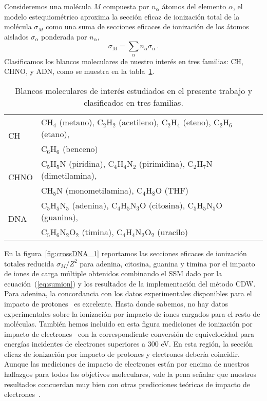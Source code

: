 Consideremos una molécula $M$ compuesta por $n_{\alpha}$ átomos del 
elemento $\alpha$, el modelo estequiométrico aproxima la sección eficaz 
de ionización total de la molécula $\sigma_{M}$ como una suma de 
secciones eficaces de ionización de los átomos aislados $\sigma_{\alpha}$ 
ponderada por $n_{\alpha}$, 
\begin{equation}
 \sigma_{M}=\sum\limits_{\alpha}n_{\alpha}\sigma_{\alpha}\,.  
 \label{eq:sumion}
\end{equation}
Clasificamos los blancos moleculares de nuestro interés en tres
familias: CH, CHNO, y ADN, como se muestra en la tabla~\ref{tab:families}.

\begin{table}[t]
\begin{center}
\begin{tabular}{|p{}|p{}|}
\hline
\multirow{2}{*}{CH} & CH$_4$ (metano), C$_2$H$_2$ (acetileno), 
C$_2$H$_4$ (eteno), C$_2$H$_6$ (etano), \\ & C$_6$H$_6$ (benceno) \\
\hline
\multirow{2}{*}{CHNO} & C$_5$H$_5$N (piridina), C$_4$H$_4$N$_2$ (pirimidina), 
C$_2$H$_7$N (dimetilamina), \\ & CH$_5$N (monometilamina), 
C$_4$H$_8$O (THF) \\[0.2em]
\hline
\multirow{2}{*}{DNA} & C$_5$H$_5$N$_5$ (adenina), C$_4$H$_5$N$_3$O (citosina), 
C$_5$H$_5$N$_5$O (guanina), \\ & C$_5$H$_6$N$_2$O$_2$ (timina),
C$_4$H$_4$N$_2$O$_2$ (uracilo) \\
\hline
\end{tabular}
\caption[Blancos moleculares estudiados y clasificados en tres familias.]
{Blancos moleculares de interés estudiados en el presente trabajo y 
clasificados en tres familias.}
\label{tab:families}
\end{center}
\end{table}

En la figura~\ref{fig:crossDNA_1} reportamos las secciones eficaces de 
ionización totales reducida $\sigma_M/Z^2$ para adenina, citosina, 
guanina y timina por el impacto de iones de carga múltiple obtenidos 
combinando el SSM dado por la ecuación~(\ref{eq:sumion}) y los 
resultados de la implementación del método CDW. Para adenina, la 
concordancia con los datos experimentales disponibles para el impacto 
de protones~\cite{iriki2011} es excelente. Hasta donde sabemos, no hay 
datos experimentales sobre la ionización por impacto de iones cargados 
para el resto de moléculas. También hemos incluido en esta figura 
mediciones de ionización por impacto de electrones~\cite{rahman2016} 
con la correspondiente conversión de equivelocidad para energías 
incidentes de electrones superiores a 300 eV. En esta región, la 
sección eficaz de ionización por impacto de protones y electrones 
debería coincidir. Aunque las mediciones de impacto de electrones están 
por encima de nuestros hallazgos para todos los objetivos moleculares, 
vale la pena señalar que nuestros resultados concuerdan muy bien con 
otras predicciones teóricas de impacto de 
electrones~\cite{mozejko2003,tan2018}. 

